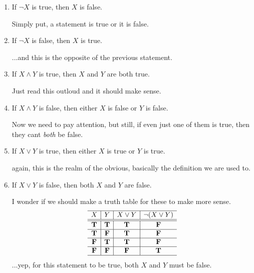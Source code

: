 \begin{enumerate}
\item If $\neg X$ is true, then $X$ is false.\label{fs1} \ifKey \hfill\begin{minipage}{0.3\textwidth}\color{red}Simply put, a statement is true or it is false.  \end{minipage}\fi

\item If $\neg X$ is false, then $X$ is true.\label{fs2} \ifKey\hfill\begin{minipage}{0.3\textwidth}\color{red}...and this is the opposite of the previous statement.  \end{minipage}\fi

\item If $X\land Y$ is true, then $X$ and $Y$ are both true.\label{fs3}  \ifKey\hfill\begin{minipage}{0.3\textwidth}\color{red} Just read this outloud and it should make sense. \end{minipage}\fi

\item If $X\land Y$ is false, then either $X$ is false or $Y$ is false.\label{fs4} \ifKey\hfill\begin{minipage}{0.3\textwidth}\color{red}Now we need to pay attention, but still, if even just one of them is true, then they cant \emph{both} be false.  \end{minipage}\fi

\item If $X\lor Y$ is true, then either $X$ is true or $Y$ is true.\label{fs5} \ifKey\hfill\begin{minipage}{0.3\textwidth}\color{red} again, this is the realm of the obvious, basically the definition we are used to. \end{minipage}\fi

\item If $X\lor Y$ is false, then both $X$ and  $Y$ are false.\label{fs6} \ifKey\hfill\begin{minipage}[t]{0.3\textwidth}\color{red} I wonder if we should make a truth table for these to make more sense.  
\[  \begin{array}{c|c|c|c}
  \hline  
X	&Y	& X\lor Y	& \neg(X\lor Y)\\
  \hline
  \hline
 \mathbf{T} &  \mathbf{T} &  \mathbf{T} & \mathbf{F}\\
  \hline
 \mathbf{T} &  \mathbf{F} &  \mathbf{T}& \mathbf{F}\\
  \hline
 \mathbf{F} &  \mathbf{T} &  \mathbf{T}& \mathbf{F}\\
  \hline
 \mathbf{F} &  \mathbf{F} &  \mathbf{F}& \mathbf{T}\\
    \hline
    \end{array}\]
 ...yep, for this statement to be true, both $X$ and $Y$ must be false.
 \end{minipage}
 \fi


\end{enumerate}
